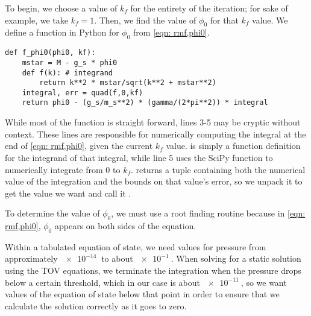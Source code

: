 \medskip
\begin{itemize}
\end{itemize}
\medskip

To begin, we choose a value of $k_f$ for the entirety of the iteration; for sake of example, we take $k_f = 1$. Then, we find the value of $\phi_0$ for that $k_f$ value. We define a function in Python for $\phi_0$ from \eqref{eqn: rmf,phi0}. 

\begin{lstlisting}
def f_phi0(phi0, kf):
    mstar = M - g_s * phi0
    def f(k): # integrand
        return k**2 * mstar/sqrt(k**2 + mstar**2)
    integral, err = quad(f,0,kf)
    return phi0 - (g_s/m_s**2) * (gamma/(2*pi**2)) * integral
\end{lstlisting}

While most of the function is straight forward, lines 3-5 may be cryptic without context. These lines are responsible for numerically computing the integral at the end of \eqref{eqn: rmf,phi0}, given the current $k_f$ value.  is simply a function definition for the integrand of that integral, while line 5 uses the SciPy function  to numerically integrate  from $0$ to $k_f$.  returns a tuple containing both the numerical value of the integration and the bounds on that value's error, so we unpack it to get the value we want and call it . 

To determine the value of $\phi_0$, we must use a root finding routine because in \eqref{eqn: rmf,phi0}, $\phi_0$ appears on both sides of the equation.

 Within a tabulated equation of state, we need values for pressure from approximately $\SI{e-14}{}$ to about $\SI{e-1}{}$. When solving for a static solution using the TOV equations, we terminate the integration when the pressure drops below a certain threshold, which in our case is about $\SI{e-11}{}$, so we want values of the equation of state below that point in order to ensure that we calculate the solution correctly as it goes to zero. 